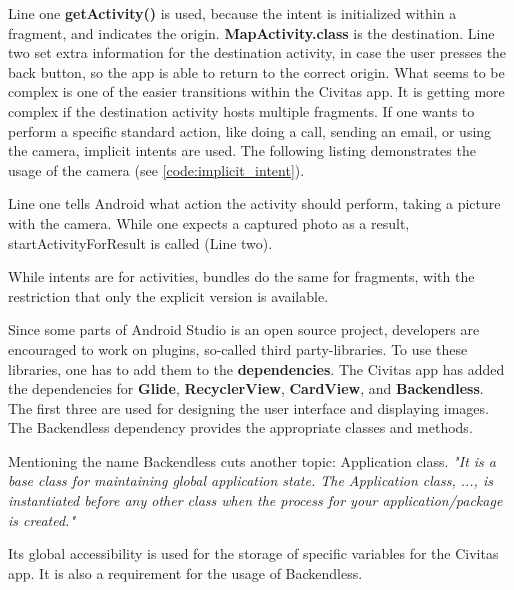\fbox{

}

Line one \textbf{getActivity()} is used, because the intent is initialized within a fragment, and indicates the origin. \textbf{MapActivity.class} is the destination. Line two set extra information for the destination activity, in case the user presses the back button, so the app is able to return to the correct origin. What seems to be complex is one of the easier transitions within the Civitas app. It is getting more complex if the destination activity hosts multiple fragments.
If one wants to perform a specific standard action, like doing a call, sending an email, or using the camera, implicit intents are used. The following listing demonstrates the usage of the camera (see \ref{code:implicit_intent}).

\fbox{

}

Line one tells Android what action the activity should perform, taking a picture with the camera. While one expects a captured photo as a result, startActivityForResult is called (Line two).

While intents are for activities, bundles do the same for fragments, with the restriction that only the explicit version is available.

Since some parts of Android Studio is an open source project, developers are encouraged to work on plugins, so-called third party-libraries. To use these libraries, one has to add them to the \textbf{dependencies}. The Civitas app has added the dependencies for \textbf{Glide}, \textbf{RecyclerView}, \textbf{CardView}, and \textbf{Backendless}. The first three are used for designing the user interface and displaying images. The Backendless dependency provides the appropriate classes and methods.

Mentioning the name Backendless cuts another topic: Application class. \textit{"It is a base class for maintaining global application state. The Application class, ..., is instantiated before any other class when the process for your application/package is created."} \cite{applicationClass}
 
Its global accessibility is used for the storage of specific variables for the Civitas app.
It is also a requirement for the usage of Backendless.

